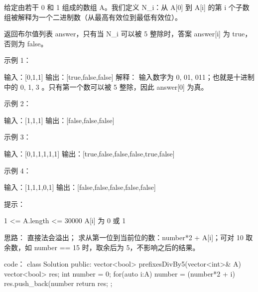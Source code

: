 给定由若干 0 和 1 组成的数组 A。我们定义 N_i：从 A[0] 到 A[i] 的第 i 个子数组被解释为一个二进制数（从最高有效位到最低有效位）。

返回布尔值列表 answer，只有当 N_i 可以被 5 整除时，答案 answer[i] 为 true，否则为 false。

 

示例 1：

输入：[0,1,1]
输出：[true,false,false]
解释：
输入数字为 0, 01, 011；也就是十进制中的 0, 1, 3 。只有第一个数可以被 5 整除，因此 answer[0] 为真。

示例 2：

输入：[1,1,1]
输出：[false,false,false]

示例 3：

输入：[0,1,1,1,1,1]
输出：[true,false,false,false,true,false]

示例 4：

输入：[1,1,1,0,1]
输出：[false,false,false,false,false]

 

提示：

    1 <= A.length <= 30000
    A[i] 为 0 或 1

































思路：
直接法会溢出；
求从第一位到当前位的数：number*2 + A[i]；可对 10 取余数，如  number == 15 时，取余后为 5，不影响之后的结果。
































code：
class Solution {
public:
    vector<bool> prefixesDivBy5(vector<int>& A) {
        vector<bool> res;
        int number = 0;
        for(auto i:A)
        {
            number = (number*2 + i) %
            res.push_back(number %
        }
        return res;
    }
};